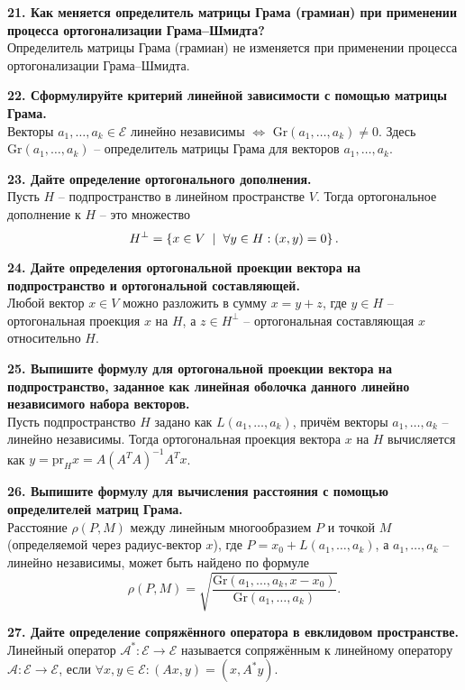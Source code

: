 \documentclass[11pt,a4paper]{article}
\newcommand{\A}{\mathcal{A}}
\newcommand{\E}{\mathcal{E}}
\newcommand{\Gr}[1]{\mathrm{Gr}\left(#1\right)}
\renewcommand{\mid}{\hspace{2mm}\middle|\hspace{2mm}}
\begin{document}
\textbf{21. Как меняется определитель матрицы Грама (грамиан) при применении процесса ортогонализации Грама--Шмидта?\\}
Определитель матрицы Грама (грамиан) не изменяется при применении процесса ортогонализации Грама--Шмидта.

\textbf{22. Сформулируйте критерий линейной зависимости с помощью матрицы Грама.\\}
Векторы $a_1, \hdots, a_k \in \E$ линейно независимы $\Leftrightarrow$ $\Gr{a_1, \hdots, a_k} \neq 0$. Здесь $\Gr{a_1, \hdots, a_k}$ -- определитель матрицы Грама для векторов $a_1, \hdots, a_k$. 

\textbf{23. Дайте определение ортогонального дополнения.\\}
Пусть $H$ -- подпространство в линейном пространстве $V$. Тогда ортогональное дополнение к $H$ -- это множество
$$H^\perp = \left\{ x \in V \mid \forall y \in H: (x, y) = 0 \right\}.$$

\textbf{24. Дайте определения ортогональной проекции вектора на подпространство и ортогональной составляющей.\\}
Любой вектор $x \in V$ можно разложить в сумму $x = y + z$, где $y \in H$ -- ортогональная проекция $x$ на $H$, а $z \in H^\perp$ -- ортогональная составляющая $x$ относительно $H$.

\textbf{25. Выпишите формулу для ортогональной проекции вектора на подпространство, заданное как линейная оболочка данного линейно независимого набора векторов.\\}
Пусть подпространство $H$ задано как $L(a_1, \hdots, a_k)$, причём векторы $a_1, \hdots, a_k$ -- линейно независимы. Тогда ортогональная проекция вектора $x$ на $H$ вычисляется как $y = \mathrm{pr}_H x = A (A^T A)^{-1} A^T x$.

\textbf{26. Выпишите формулу для вычисления расстояния с помощью определителей матриц Грама.\\}
Расстояние $\rho(P, M)$ между линейным многообразием $P$ и точкой $M$ (определяемой через радиус-вектор $x$), где $P = x_0 + L(a_1, \hdots, a_k)$, а $a_1, \hdots, a_k$ -- линейно независимы, может быть найдено по формуле $$\rho(P, M) = \sqrt{\frac{\Gr{a_1, \hdots, a_k, x - x_0}}{\Gr{a_1, \hdots, a_k}}}.$$

\textbf{27. Дайте определение сопряжённого оператора в евклидовом пространстве.\\}
Линейный оператор $\A^* : \E \rightarrow \E$ называется сопряжённым к линейному оператору $\A : \E \rightarrow \E$, если $\forall x, y \in \E: (Ax, y) = (x, A^* y)$.
\end{document}
